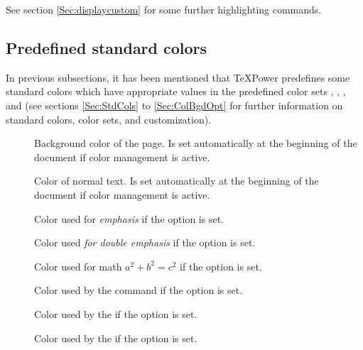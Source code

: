 \begin{slide}
\begin{description}
    See section \ref{Sec:displaycustom} for some further highlighting commands.
  \end{description}

  \newslide

  \subsection{Predefined standard colors}\label{Sec:Colors}
  In previous subsections, it has been mentioned that \TeX Power predefines some standard colors which have appropriate
  values in the predefined color sets , , , and  (see sections
  \ref{Sec:StdCols} to \ref{Sec:ColBgdOpt} for further information on standard colors, color sets, and customization).
  \begin{description}
  \item[]
    Background color of the page. Is set automatically at the beginning of the
    document if color management is active.

  \item[]
    Color of normal text. Is set automatically at the beginning of the
    document if color management is active.

  \item[]
    Color used for \emph{emphasis} if the  option is set.

  \item[]
    Color used \emph{for \emph{double} emphasis} if the  option
    is set.

  \item[]
    Color used for math $a^2+b^2=c^2$ if the  option is set.

  \item[]
    Color used by the  command if the 
    option is set.

  \item[]
    Color used by the  if the
     option is set.

  \item[]
    Color used by the  if the
     option is set.


\end{description}
\end{slide}
